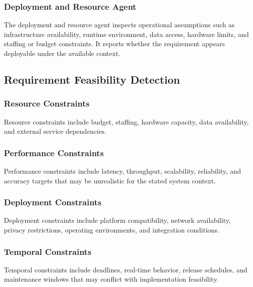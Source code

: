 \subsubsection{Deployment and Resource Agent}
\label{method:deployment_agent}

The deployment and resource agent inspects operational assumptions such as infrastructure availability, runtime environment, data access, hardware limits, and staffing or budget constraints.
It reports whether the requirement appears deployable under the available context.

\subsection{Requirement Feasibility Detection}
\label{method:detection}

\subsubsection{Resource Constraints}
\label{method:resource_constraints}

Resource constraints include budget, staffing, hardware capacity, data availability, and external service dependencies.

\subsubsection{Performance Constraints}
\label{method:performance_constraints}

Performance constraints include latency, throughput, scalability, reliability, and accuracy targets that may be unrealistic for the stated system context.

\subsubsection{Deployment Constraints}
\label{method:deployment_constraints}

Deployment constraints include platform compatibility, network availability, privacy restrictions, operating environments, and integration conditions.

\subsubsection{Temporal Constraints}
\label{method:temporal_constraints}

Temporal constraints include deadlines, real-time behavior, release schedules, and maintenance windows that may conflict with implementation feasibility.

